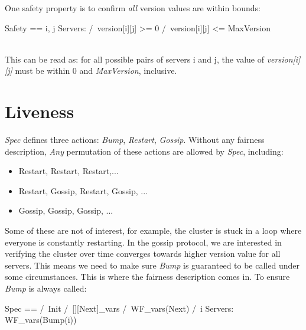 One safety property is to confirm \textit{all} version values are within bounds:\\
\begin{tla}
Safety == 
    \A i, j \in Servers: 
       /\ version[i][j] >= 0 
       /\ version[i][j] <= MaxVersion
\end{tla}
\begin{tlatex}
%
%
%
%
\end{tlatex}
\\

This can be read as: for all possible pairs of servers i and j, the value of
\textit{version[i][j]} must be within 0 and \textit{MaxVersion}, inclusive.

\section{Liveness}

\textit{Spec} defines three actions: \textit{Bump}, \textit{Restart},
\textit{Gossip}. Without any fairness description, \textit{Any} permutation of
these actions are allowed by \textit{Spec}, including:
\begin{itemize}
    \item Restart, Restart, Restart,...
    \item Restart, Gossip, Restart, Gossip, ... 
    \item Gossip, Gossip, Gossip, ... 
\end{itemize}

Some of these are not of interest, for example, the cluster is stuck in a
loop where everyone is constantly restarting. In the gossip protocol, we are
interested in verifying the cluster over time converges towards higher version
value for all servers. This means we need to make sure \textit{Bump} is
guaranteed to be called under some circumstances. This is where the fairness
description comes in. To ensure \textit{Bump} is always called:\\

\begin{tla}
Spec ==
  /\ Init
  /\ [][Next]_vars
  /\ WF_vars(Next)
  /\ \A i \in Servers: 
    WF_vars(Bump(i))
\end{tla}
\begin{tlatex}
%
%
%
%
%
%
\end{tlatex}
\\

